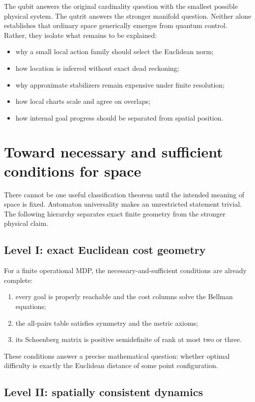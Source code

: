 \documentclass[11pt]{article}
\theoremstyle{definition}
\theoremstyle{remark}
\begin{document}
The qubit answers the original cardinality question with the smallest possible
physical system. The qutrit answers the stronger manifold question. Neither
alone establishes that ordinary space generically emerges from quantum
control. Rather, they isolate what remains to be explained:
\begin{itemize}
 \item why a small local action family should select the Euclidean norm;
 \item how location is inferred without exact dead reckoning;
 \item why approximate stabilizers remain expensive under finite resolution;
 \item how local charts scale and agree on overlaps;
 \item how internal goal progress should be separated from spatial position.
\end{itemize}

\section{Toward necessary and sufficient conditions for space}
\label{sec:conditions}

There cannot be one useful classification theorem until the intended meaning
of space is fixed. Automaton universality makes an unrestricted statement
trivial. The following hierarchy separates exact finite geometry from the
stronger physical claim.

\subsection{Level I: exact Euclidean cost geometry}

For a finite operational MDP, the necessary-and-sufficient conditions are
already complete:
\begin{enumerate}
  \item every goal is properly reachable and the cost columns solve the
  Bellman equations;
  \item the all-pairs table satisfies symmetry and the metric axioms;
  \item its Schoenberg matrix is positive semidefinite of rank at most two or
  three.
\end{enumerate}
These conditions answer a precise mathematical question: whether optimal
difficulty is exactly the Euclidean distance of some point configuration.

\subsection{Level II: spatially consistent dynamics}
\end{document}
